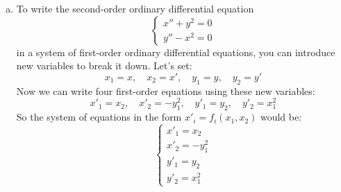\documentclass[12pt]{exam}
\begin{document}
\begin{enumerate}[(a)]
     \item To write the second-order ordinary differential equation
	  \[\begin{cases}
		  x'' + y^2 = 0 \\
		  y'' - x^2 = 0
	  \end{cases}\]
	in a system of first-order ordinary differential equations, you can introduce new variables to break it down. Let's set:
	\[x_1 = x ,\quad x_2 = x' ,\quad y_1 = y ,\quad y_2 = y'\]
	Now we can write four first-order equations using these new variables:
	\[x'_1 = x_2 ,\quad x'_2 = -y_1^2 ,\quad y'_1 = y_2 ,\quad y'_2 = x_1^2\]
	So the system of equations in the form \(x'_i = f_i(x_1, x_2)\) would be:
	\[\begin{cases}
		x'_1 = x_2 \\
		x'_2 = -y_1^2 \\
		y'_1 = y_2 \\
		y'_2 = x_1^2
	\end{cases}\]
\end{enumerate}

\newpage
\end{document}
